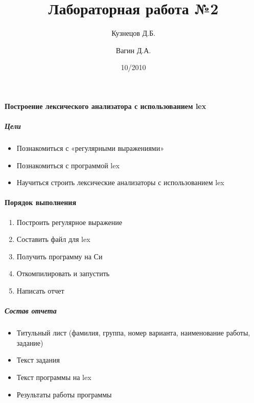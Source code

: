 \documentclass[a4paper,12pt]{article}
\title{Лабораторная работа №2}
\author{Кузнецов Д.Б.\and Вагин Д.А.}
\date{10/2010}
\begin{document}
\paragraph{Построение лексического анализатора с использованием lex}
\subparagraph{Цели}
\begin{itemize}
	\item Познакомиться с «регулярными выражениями»
	\item Познакомиться с программой lex
	\item Научиться строить лексические анализаторы с использованием lex
\end{itemize}

\paragraph{Порядок выполнения}
\begin{enumerate}
	\item Построить регулярное выражение
	\item Составить файл для lex
	\item Получить программу на Си
	\item Откомпилировать и запустить
	\item Написать отчет
\end{enumerate}

\subparagraph{Состав отчета}
\begin{itemize}
	\item Титульный лист (фамилия, группа, номер варианта, наименование работы, задание)
	\item Текст задания
	\item Текст программы на lex
	\item Результаты работы программы
\end{itemize}
\end{document}
